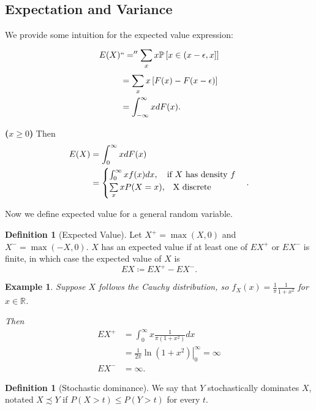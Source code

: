 \documentclass{tufte-handout}
\newcommand*\R{\mathbb{R}}
\renewcommand{\P}{\mathbb{P}}
\newtheorem{ex}[thm]{Example}
\theoremstyle{definition}
\newtheorem{defn}[thm]{Definition}
\begin{document}
\subsection{Expectation and Variance}
We provide some intuition for the expected value expression:
\begin{align*}
	E(X) &``='' \sum\limits_{x}^{} x \P\left[x \in (x - \epsilon, x]\right]  \\
	&= \sum\limits_{x}^{} x \left[ F(x) - F(x - \epsilon) \right]  \\
	&= \int_{-\infty}^{\infty} x dF(x) 
.\end{align*}

\textbf{($x \ge 0$)} Then 
\begin{align*}
	E(X) &= \int_{0}^{\infty} x dF(x) \\
		 &= \begin{cases}
			 \int_{0}^{\infty} x f(x) dx, \quad \text{if $X$ has density $f$} \\
			\sum\limits_{x}^{} x P(X = x),\quad $X$ \text{ discrete}
		 \end{cases}
.\end{align*}

Now we define expected value for a general random variable. 
\begin{defn}[Expected Value]
	
	Let $X^+ = \max(X,0)$ and $X^- = \max(-X,0)$.
	$X$ has an expected value if at least one of $EX^+$ or $EX^-$ is finite, in which case the expected value of $X$ is \[
		EX \coloneqq EX^+ - EX^-
	.\] 

\end{defn}

\begin{ex}
	Suppose $X$ follows the Cauchy distribution, so $f_X(x) = \frac{1}{\pi} \frac{1}{1+x^2}$ for $x \in \R$.

	Then 
	\begin{align*}
		EX^+ &= \int_{0}^{\infty} x \frac{1}{\pi(1+x^2)}dx  \\
			 &= \left.\frac{1}{2\pi} \ln{(1+x^2)} \right|_{0}^{\infty} = \infty \\
			 EX^- &= \infty
	.\end{align*}
\end{ex}

\begin{defn}[Stochastic dominance]
	We say that $Y$ stochastically dominates $X$, notated $X \precsim Y$ if $P(X > t) \le P(Y > t)$ for every $t$.
\end{defn}
\end{document}

